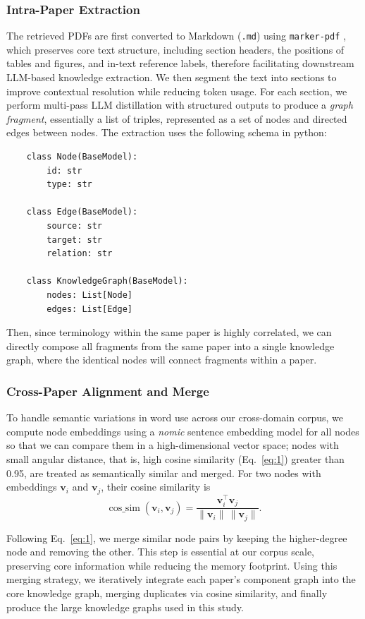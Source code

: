 \subsubsection{Intra-Paper Extraction}
The retrieved PDFs are first converted to Markdown (\texttt{.md}) using \texttt{marker-pdf} \cite{marker-github}, which preserves core text structure, including section headers, the positions of tables and figures, and in-text reference labels, therefore facilitating downstream LLM-based knowledge extraction. We then segment the text into sections  to improve contextual resolution while reducing token usage. For each section, we perform multi-pass LLM distillation with structured outputs to produce a \emph{graph fragment}, essentially a list of triples, represented as a set of nodes and directed edges between nodes. The extraction uses the following schema in python:

\begin{verbatim}
    class Node(BaseModel):
        id: str
        type: str
            
    class Edge(BaseModel):
        source: str
        target: str
        relation: str
            
    class KnowledgeGraph(BaseModel):
        nodes: List[Node]
        edges: List[Edge]
\end{verbatim}

Then, since terminology within the same paper is highly correlated, we can directly compose all fragments from the same paper into a single knowledge graph, where the identical nodes will connect fragments within a paper.

\subsubsection{Cross-Paper Alignment and Merge}
To handle semantic variations in word use across our cross-domain corpus, we compute node embeddings using a \emph{nomic} sentence embedding model for all nodes so that we can compare them in a high-dimensional vector space; nodes with small angular distance, that is, high cosine similarity (Eq.~\ref{eq:1}) greater than 0.95, are treated as semantically similar and merged. For two nodes with embeddings $\mathbf{v}_i$ and $\mathbf{v}_j$, their cosine similarity is
\begin{equation}
\operatorname{cos\_sim}(\mathbf{v}_i,\mathbf{v}_j)
= \frac{\mathbf{v}_i^\top \mathbf{v}_j}{\lVert \mathbf{v}_i\rVert \,\lVert \mathbf{v}_j\rVert}.
\label{eq:1}
\end{equation}

Following Eq.~\ref{eq:1}, we merge similar node pairs by keeping the higher-degree node and removing the other. This step is essential at our corpus scale, preserving core information while reducing the memory footprint. Using this merging strategy, we iteratively integrate each paper’s component graph into the core knowledge graph, merging duplicates via cosine similarity, and finally produce the large knowledge graphs used in this study. 